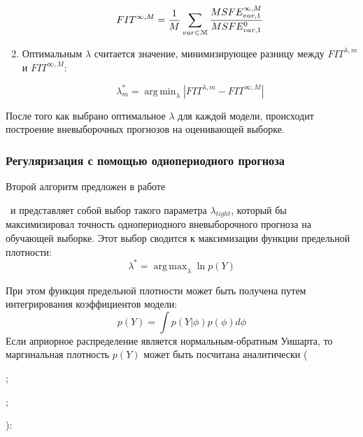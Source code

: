 \documentclass[11pt]{article} %
\DeclareMathOperator*{\argmax}{arg\,max}
\DeclareMathOperator*{\argmin}{arg\,min}
\newcommand{\eng}[1]{\begin{otherlanguage}{english}#1\end{otherlanguage}}
\begin{document}
\begin{enumerate}
\begin{equation}
FIT^{\infty,M}=\frac{1}{M} \sum_{var\in \EuScript{M}} \frac{MSFE_{var,1}^{\infty,M}}{MSFE_{var,1}^{0}}
\end{equation}
\item Оптимальным $\lambda$ считается значение, минимизирующее разницу между $FIT^{\lambda,m}$ и $FIT^{\infty,M}$:

\begin{equation}
\lambda^*_m=\argmin_{\lambda} |FIT^{\lambda, m}-FIT^{\infty,M}|
\end{equation}
\end{enumerate}

После того как выбрано оптимальное $\lambda$ для каждой модели, происходит построение вневыборочных прогнозов на оценивающей выборке.

\subsubsection{Регуляризация с помощью однопериодного прогноза }

Второй алгоритм предложен в работе \eng{\cite{doan_al_1984}}~и представляет собой выбор такого параметра $\lambda_{tight}$, который бы максимизировал точность однопериодного вневыборочного прогноза на обучающей выборке. Этот выбор сводится к максимизации функции предельной плотности:
\begin{equation}
\lambda^*=\argmax_{\lambda} \ln p(Y)
\end{equation}

При этом функция предельной плотности может быть получена путем интегрирования коэффициентов модели:
\begin{equation}
p(Y)=\int p(Y|\phi)p(\phi) d \phi
\end{equation}
Если априорное распределение является нормальным-обратным Уишарта, то маргинальная плотность $p(Y)$ может быть посчитана аналитически (\eng{\cite{zellner_1996}}; \eng{\cite{bauwens_al_2000}}; \eng{\cite{carriero_al_2012}}):

\end{document}
